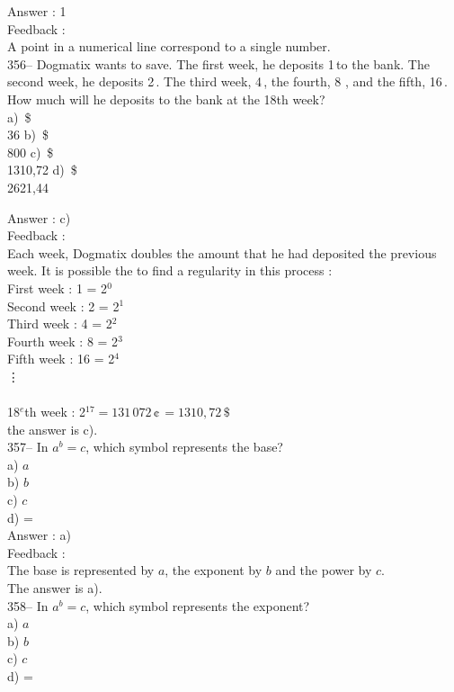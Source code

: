 ﻿\documentclass[letterpaper, 12pt]{article}
\begin{document}
Answer : 1\\

Feedback : \\
A point in a numerical line correspond to a single number.\\

356-- Dogmatix wants to save. The first week, he deposits 1\,\cent to the bank. The second week, he deposits
2\,\cent. The third week, 4\,\cent, the fourth, 8\,\cent\,, and the fifth, 16\,\cent.  How much will he deposits to the bank at the 18th week?\\
a) \,\$\\36
b) \,\$\\800
c) \,\$\\1310,72
d) \,\$\\2621,44

Answer : c) \\

Feedback : \\
Each week, Dogmatix doubles the amount that he had deposited the previous week. It is possible the to find a regularity in this process :\\
First week : 1\,\cent\,= 2$^{0}$\\
Second week : 2\,\cent\,= 2$^{1}$\\
Third week : 4\,\cent\,= 2$^{2}$\\
Fourth week : 8\,\cent\,= 2$^{3}$\\
Fifth week : 16\,\cent\,= 2$^{4}$\\
\vdots\\\\
18$^e$th week : 2$^{17}=131\,072\,\cent\,=1310,72\,\$$\\
the answer is c).\\

357-- In $a^{b}=c$, which symbol represents the base?\\
a) $a$\\
b) $b$\\
c) $c$\\
d) =\\

Answer : a)\\

Feedback : \\
The base is represented by $a$, the exponent by $b$ and the power by $c$.\\
The answer is a).\\

358-- In $a^{b}=c$, which symbol represents the exponent?\\
a) $a$\\
b) $b$\\
c) $c$\\
d) =\\
\end{document}

